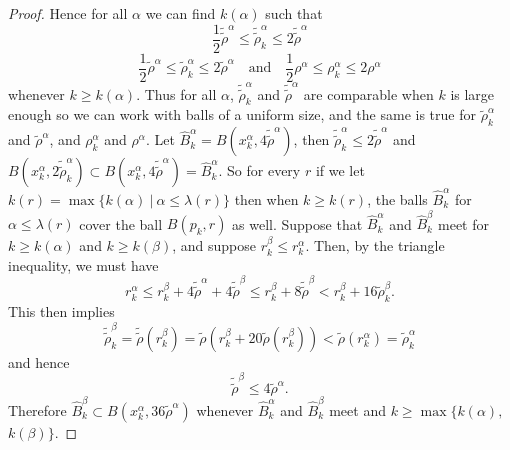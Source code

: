 \begin{proof}
Hence for all $\alpha$ we can find $k({\alpha})$ such that
$$
\frac{1}{2}\tilde{\tilde\rho}^{\alpha}
\le\tilde{\tilde\rho}_k^{\alpha} \le 2\tilde{\tilde\rho}^{\alpha}
$$
$$
\frac{1}{2}\tilde\rho^{\alpha}\le \tilde\rho_k^{\alpha}\le
2\tilde\rho^{\alpha} \quad \mbox{and} \quad
\frac{1}{2}\rho^{\alpha}\le \rho_k^{\alpha}\le 2\rho^{\alpha}
$$
whenever $k\ge k(\alpha)$. Thus for all $\alpha$,
$\tilde{\tilde\rho}_k^{\alpha}$ and $\tilde{\tilde\rho}^{\alpha}$
are comparable when $k$ is large enough so we can work with balls
of a uniform size, and the same is true for
$\tilde\rho_k^{\alpha}$ and $\tilde\rho^{\alpha}$, and
$\rho_k^{\alpha}$ and $\rho^{\alpha}$. Let $\hat
B_k^{\alpha}=B(x_k^{\alpha}, 4\tilde{\tilde\rho}^{\alpha})$, then
$\tilde{\tilde\rho}_k^{\alpha}\le 2\tilde{\tilde\rho}^{\alpha}$
and $B(x_k^{\alpha}, 2\tilde{\tilde\rho}_k^{\alpha})\subset
B(x_k^{\alpha}, 4\tilde{\tilde\rho}^{\alpha})=\hat B_k^{\alpha}$.
So for every $r$ if we let $k(r)=\max\{k(\alpha) \  |\ \alpha\le
\lambda(r)\}$ then when $k\ge k(r)$, the balls $\hat B_k^{\alpha}$
for $\alpha\le \lambda(r)$ cover the ball $B(p_k, r)$ as well.
Suppose that $\hat B_k^{\alpha}$ and $\hat B_k^{\beta}$ meet for
$k\ge k({\alpha})$ and $k\ge k({\beta})$, and suppose
$r_k^{\beta}\le r_k^{\alpha}$. Then, by the triangle inequality,
we must have
$$
r_k^{\alpha}\le r_k^{\beta}
+4\tilde{\tilde\rho}^{\alpha}+4\tilde{\tilde\rho}^{\beta}\le
r_k^{\beta} +8\tilde{\tilde\rho}^{\beta}<r_k^{\beta}
+16\tilde\rho_k^{\beta}.
$$
This then implies
$$
\tilde{\tilde\rho}_k^{\beta}=\tilde{\tilde\rho}(r_k^{\beta})=
\tilde\rho(r_k^{\beta}+20\tilde\rho(r_k^{\beta}))
<\tilde\rho(r_k^{\alpha})=\tilde\rho_k^{\alpha}
$$
and hence
$$
\tilde{\tilde\rho}^{\beta}\le 4\tilde\rho^{\alpha}.
$$
Therefore $\hat B_k^{\beta}\subset B(x_k^{\alpha},
36\tilde\rho^{\alpha})$ whenever $\hat B_k^{\alpha}$ and $\hat
B_k^{\beta}$ meet and $k\ge \max\{ k({\alpha}),$ $k({\beta})\}.$


\end{proof}
